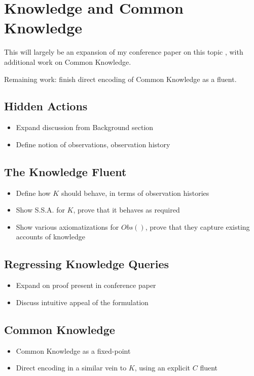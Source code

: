 \chapter{Knowledge and Common Knowledge}\label{ch:knowledge}

This will largely be an expansion of my conference paper on this topic \cite{kelly07sc_know_obs}, with additional work on Common Knowledge.

Remaining work:  finish direct encoding of Common Knowledge as a fluent.

\section{Hidden Actions}

\begin{itemize}
\item Expand discussion from Background section
\item Define notion of observations, observation history
\end{itemize}

\section{The Knowledge Fluent}

\begin{itemize}
\item Define how $K$ should behave, in terms of observation histories
\item Show S.S.A. for $K$, prove that it behaves as required
\item Show various axiomatizations for $Obs()$, prove that they capture
existing accounts of knowledge
\end{itemize}

\section{Regressing Knowledge Queries}

\begin{itemize}
\item Expand on proof present in conference paper
\item Discuss intuitive appeal of the formulation
\end{itemize}

\section{Common Knowledge}

\begin{itemize}
\item Common Knowledge as a fixed-point
\item Direct encoding in a similar vein to $K$, using an explicit $C$ fluent
\end{itemize}


